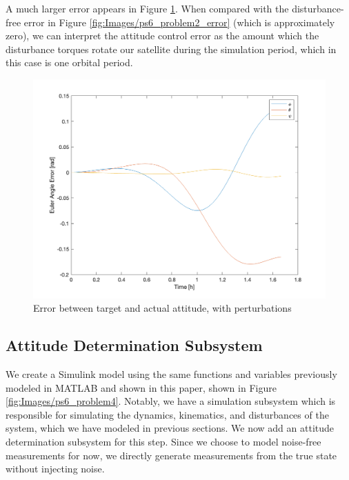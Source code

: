 A much larger error appears in Figure \ref{fig:Images/ps6_problem3_error}. When compared with the disturbance-free error in Figure \ref{fig:Images/ps6_problem2_error} (which is approximately zero), we can interpret the attitude control error as the amount which the disturbance torques rotate our satellite during the simulation period, which in this case is one orbital period.

\begin{figure}[H]
\centering
\includegraphics[scale=0.6]{Images/ps6_problem3_error.png}
\caption{Error between target and actual attitude, with perturbations}
\label{fig:Images/ps6_problem3_error}
\end{figure}

\subsection{Attitude Determination Subsystem}
We create a Simulink model using the same functions and variables previously modeled in MATLAB and shown in this paper, shown in Figure \ref{fig:Images/ps6_problem4}. Notably, we have a simulation subsystem which is responsible for simulating the dynamics, kinematics, and disturbances of the system, which we have modeled in previous sections. We now add an attitude determination subsystem for this step. Since we choose to model noise-free measurements for now, we directly generate measurements from the true state without injecting noise.


